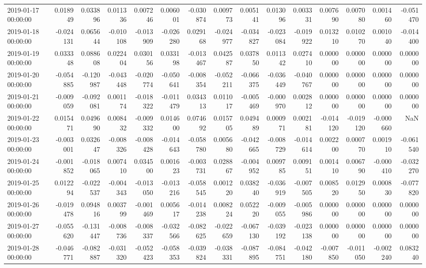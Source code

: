 \begin{tabular}{lrrrrrrrrrrrrrr}
2019-01-17 00:00:00 & 0.018949 & 0.033896 & 0.011336 & 0.007246 & 0.006001 & -0.030874 & 0.009773 & 0.005141 & 0.013096 & 0.003331 & 0.007690 & 0.007080 & 0.001460 & -0.051470 \\
2019-01-18 00:00:00 & -0.024131 & 0.065644 & -0.010108 & -0.013909 & -0.026280 & 0.029168 & -0.024977 & -0.034827 & -0.023084 & -0.019922 & 0.013210 & 0.010270 & 0.001040 & -0.014400 \\
2019-01-19 00:00:00 & 0.033348 & 0.088608 & 0.022404 & 0.030156 & 0.033198 & -0.013467 & 0.042587 & 0.037850 & 0.011342 & 0.027410 & 0.000000 & 0.000000 & 0.000000 & 0.000000 \\
2019-01-20 00:00:00 & -0.054885 & -0.120987 & -0.043448 & -0.020774 & -0.050641 & -0.008354 & -0.052211 & -0.066375 & -0.036449 & -0.040767 & 0.000000 & 0.000000 & 0.000000 & 0.000000 \\
2019-01-21 00:00:00 & -0.009059 & -0.092081 & 0.001174 & -0.018322 & -0.011479 & 0.034313 & 0.011017 & -0.005469 & -0.000970 & 0.002812 & 0.000000 & 0.000000 & 0.000000 & 0.000000 \\
2019-01-22 00:00:00 & 0.015471 & 0.049690 & 0.008432 & -0.009332 & 0.014600 & 0.074692 & 0.015705 & 0.049489 & 0.000971 & 0.002181 & -0.014120 & -0.019120 & -0.000660 & NaN \\
2019-01-23 00:00:00 & -0.003001 & 0.032647 & -0.008326 & -0.008428 & -0.014643 & -0.058780 & 0.005680 & -0.042665 & -0.008729 & -0.014614 & 0.002200 & 0.000770 & 0.001910 & -0.061540 \\
2019-01-24 00:00:00 & -0.001852 & -0.018065 & 0.007410 & 0.034500 & 0.001623 & -0.003731 & 0.028867 & -0.004952 & 0.009785 & 0.009151 & 0.001410 & 0.006790 & -0.000410 & -0.032270 \\
2019-01-25 00:00:00 & 0.012294 & -0.022537 & -0.004343 & -0.013050 & -0.013216 & -0.058545 & 0.001220 & 0.038240 & -0.036919 & -0.007505 & 0.008520 & 0.012950 & 0.000830 & -0.077820 \\
2019-01-26 00:00:00 & -0.019478 & 0.094816 & 0.003799 & -0.001469 & 0.005617 & -0.014238 & 0.008224 & 0.052220 & -0.009055 & -0.005986 & 0.000000 & 0.000000 & 0.000000 & 0.000000 \\
2019-01-27 00:00:00 & -0.055620 & -0.131447 & -0.008736 & -0.008337 & -0.032566 & -0.082625 & -0.022659 & -0.067130 & -0.039192 & -0.023138 & 0.000000 & 0.000000 & 0.000000 & 0.000000 \\
2019-01-28 00:00:00 & -0.046771 & -0.082887 & -0.031320 & -0.052423 & -0.058353 & -0.039824 & -0.038331 & -0.087895 & -0.084751 & -0.042180 & -0.007850 & -0.011050 & -0.002240 & 0.083240 \\

\end{tabular}
